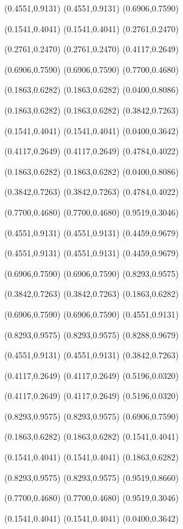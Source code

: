 \PST@Border(0.4551,0.9131)
(0.4551,0.9131)
(0.6906,0.7590)

\PST@Border(0.1541,0.4041)
(0.1541,0.4041)
(0.2761,0.2470)

\PST@Border(0.2761,0.2470)
(0.2761,0.2470)
(0.4117,0.2649)

\PST@Border(0.6906,0.7590)
(0.6906,0.7590)
(0.7700,0.4680)

\PST@Border(0.1863,0.6282)
(0.1863,0.6282)
(0.0400,0.8086)

\PST@Border(0.1863,0.6282)
(0.1863,0.6282)
(0.3842,0.7263)

\PST@Border(0.1541,0.4041)
(0.1541,0.4041)
(0.0400,0.3642)

\PST@Border(0.4117,0.2649)
(0.4117,0.2649)
(0.4784,0.4022)

\PST@Border(0.1863,0.6282)
(0.1863,0.6282)
(0.0400,0.8086)

\PST@Border(0.3842,0.7263)
(0.3842,0.7263)
(0.4784,0.4022)

\PST@Border(0.7700,0.4680)
(0.7700,0.4680)
(0.9519,0.3046)

\PST@Border(0.4551,0.9131)
(0.4551,0.9131)
(0.4459,0.9679)

\PST@Border(0.4551,0.9131)
(0.4551,0.9131)
(0.4459,0.9679)

\PST@Border(0.6906,0.7590)
(0.6906,0.7590)
(0.8293,0.9575)

\PST@Border(0.3842,0.7263)
(0.3842,0.7263)
(0.1863,0.6282)

\PST@Border(0.6906,0.7590)
(0.6906,0.7590)
(0.4551,0.9131)

\PST@Border(0.8293,0.9575)
(0.8293,0.9575)
(0.8288,0.9679)

\PST@Border(0.4551,0.9131)
(0.4551,0.9131)
(0.3842,0.7263)

\PST@Border(0.4117,0.2649)
(0.4117,0.2649)
(0.5196,0.0320)

\PST@Border(0.4117,0.2649)
(0.4117,0.2649)
(0.5196,0.0320)

\PST@Border(0.8293,0.9575)
(0.8293,0.9575)
(0.6906,0.7590)

\PST@Border(0.1863,0.6282)
(0.1863,0.6282)
(0.1541,0.4041)

\PST@Border(0.1541,0.4041)
(0.1541,0.4041)
(0.1863,0.6282)

\PST@Border(0.8293,0.9575)
(0.8293,0.9575)
(0.9519,0.8660)

\PST@Border(0.7700,0.4680)
(0.7700,0.4680)
(0.9519,0.3046)

\PST@Border(0.1541,0.4041)
(0.1541,0.4041)
(0.0400,0.3642)

